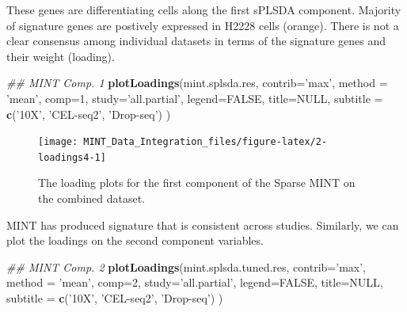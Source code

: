 \documentclass[]{book}
\newenvironment{Shaded}{\begin{snugshade}}{\end{snugshade}}
\newcommand{\CommentTok}[1]{\textcolor[rgb]{0.56,0.35,0.01}{\textit{#1}}}
\newcommand{\DataTypeTok}[1]{\textcolor[rgb]{0.13,0.29,0.53}{#1}}
\newcommand{\DecValTok}[1]{\textcolor[rgb]{0.00,0.00,0.81}{#1}}
\newcommand{\KeywordTok}[1]{\textcolor[rgb]{0.13,0.29,0.53}{\textbf{#1}}}
\newcommand{\NormalTok}[1]{#1}
\newcommand{\OtherTok}[1]{\textcolor[rgb]{0.56,0.35,0.01}{#1}}
\newcommand{\StringTok}[1]{\textcolor[rgb]{0.31,0.60,0.02}{#1}}
\theoremstyle{definition}
\theoremstyle{definition}
\theoremstyle{definition}
\theoremstyle{remark}
\begin{document}
These genes are differentiating cells along the first sPLSDA component.
Majority of signature genes are postively expressed in H2228 cells
(orange). There is not a clear consensus among individual datasets in
terms of the signature genes and their weight (loading).

\begin{Shaded}
\begin{Highlighting}[]
\CommentTok{## MINT Comp. 1}
\KeywordTok{plotLoadings}\NormalTok{(mint.splsda.res, }\DataTypeTok{contrib=}\StringTok{'max'}\NormalTok{, }\DataTypeTok{method =} \StringTok{'mean'}\NormalTok{, }\DataTypeTok{comp=}\DecValTok{1}\NormalTok{, }
             \DataTypeTok{study=}\StringTok{'all.partial'}\NormalTok{, }\DataTypeTok{legend=}\OtherTok{FALSE}\NormalTok{, }\DataTypeTok{title=}\OtherTok{NULL}\NormalTok{, }
             \DataTypeTok{subtitle =} \KeywordTok{c}\NormalTok{(}\StringTok{'10X'}\NormalTok{, }\StringTok{'CEL-seq2'}\NormalTok{, }\StringTok{'Drop-seq'}\NormalTok{) )}
\end{Highlighting}
\end{Shaded}

\begin{figure}[ht]

{\centering \texttt{[image: MINT\_Data\_Integration\_files/figure-latex/2-loadings4-1]} 

}

\caption{The loading plots for the first component of the Sparse MINT on the combined dataset.}\label{fig:2-loadings4}
\end{figure}

MINT has produced signature that is consistent across studies.
Similarly, we can plot the loadings on the second component variables.

\begin{Shaded}
\begin{Highlighting}[]
\CommentTok{## MINT Comp. 2}
\KeywordTok{plotLoadings}\NormalTok{(mint.splsda.tuned.res, }\DataTypeTok{contrib=}\StringTok{'max'}\NormalTok{, }\DataTypeTok{method =} \StringTok{'mean'}\NormalTok{, }\DataTypeTok{comp=}\DecValTok{2}\NormalTok{, }
             \DataTypeTok{study=}\StringTok{'all.partial'}\NormalTok{, }\DataTypeTok{legend=}\OtherTok{FALSE}\NormalTok{, }\DataTypeTok{title=}\OtherTok{NULL}\NormalTok{, }
             \DataTypeTok{subtitle =} \KeywordTok{c}\NormalTok{(}\StringTok{'10X'}\NormalTok{, }\StringTok{'CEL-seq2'}\NormalTok{, }\StringTok{'Drop-seq'}\NormalTok{) )}
\end{Highlighting}
\end{Shaded}
\end{document}

